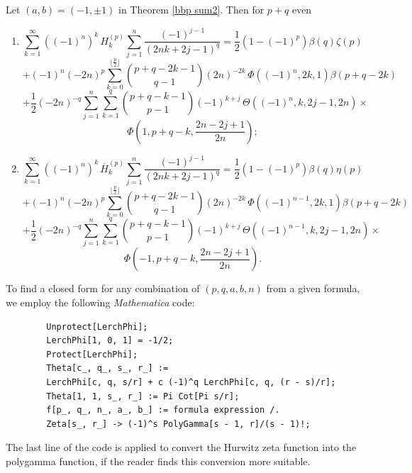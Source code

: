 \documentclass[11pt,reqno]{article}
\begin{document}
\begin{corollary}
	Let $(a,b)=(-1,\pm1)$ in Theorem \ref{bbp sum2}. Then for $p+q$ even
	\begin{enumerate}
		\item[i)]
		\[\sum_{k=1}^\infty ({(-1)}^{n})^{k}\, H_k^{(p)}\sum_{j=1}^{n}\frac{{(-1)}^{j-1}}{(2nk+2j-1)^q}=\frac12(1-{(-1)}^{p})\beta(q)\zeta(p)\]
		\[+{(-1)}^{n}{(-2n)}^{p}\sum_{k=0}^{\lfloor\frac{p}{2}\rfloor}\binom{p+q-2k-1}{q-1}{(2n)}^{-2k}\,\Phi({(-1)}^{n},2k,1)\beta(p+q-2k)\]
		\[+\frac12 {(-2n)}^{-q}\sum_{j=1}^{n}\sum_{k=1}^{q}\binom{p+q-k-1}{p-1}{(-1)}^{k+j}\,\Theta({(-1)}^{n},k,2j-1,2n)\times\]
		\[\Phi\left(1,p+q-k,\frac{2n-2j+1}{2n}\right);\]
		\item[ii)]
		\[\sum_{k=1}^\infty ({(-1)}^{n})^{k}\, \overline{H}_k^{(p)}\sum_{j=1}^{n}\frac{{(-1)}^{j-1}}{(2nk+2j-1)^q}=\frac12(1-{(-1)}^{p})\beta(q)\eta(p)\]
		\[+{(-1)}^{n}{(-2n)}^{p}\sum_{k=0}^{\lfloor\frac{p}{2}\rfloor}\binom{p+q-2k-1}{q-1}{(2n)}^{-2k}\,\Phi({(-1)}^{n-1},2k,1)\beta(p+q-2k)\]
		\[+\frac12{(-2n)}^{-q}\sum_{j=1}^{n}\sum_{k=1}^{q}\binom{p+q-k-1}{p-1}{(-1)}^{k+j}\,\Theta({(-1)}^{n-1},k,2j-1,2n)\times\]
		\[\Phi\left(-1,p+q-k,\frac{2n-2j+1}{2n}\right).\]
	\end{enumerate}
\end{corollary}



\begin{remark} To find a closed form for any combination of 
	$(p,q,a,b,n)$ from a given formula, we employ the following \textit{Mathematica} code:
	\begin{verbatim}
		Unprotect[LerchPhi];
		LerchPhi[1, 0, 1] = -1/2;
		Protect[LerchPhi];
		Theta[c_, q_, s_, r_] := 
		LerchPhi[c, q, s/r] + c (-1)^q LerchPhi[c, q, (r - s)/r];
		Theta[1, 1, s_, r_] := Pi Cot[Pi s/r]; 
		f[p_, q_, n_, a_, b_] := formula expression /. 
		Zeta[s_, r_] -> (-1)^s PolyGamma[s - 1, r]/(s - 1)!;\end{verbatim}
	The last line of the code is applied to convert the Hurwitz zeta function into the polygamma function, if the reader finds this conversion more suitable.
\end{remark}


\end{document}
